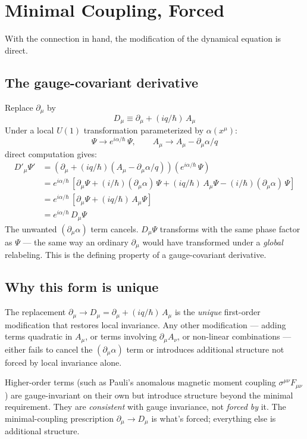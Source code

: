 \documentclass[11pt,a4paper]{article}
\begin{document}
\section{Minimal Coupling, Forced}

With the connection in hand, the modification of the dynamical equation is direct.

\subsection{The gauge-covariant derivative}

Replace $\partial_\mu$ by
\[
D_\mu \equiv \partial_\mu + (iq/\hbar)\, A_\mu
\]
Under a local $U(1)$ transformation parameterized by $\alpha(x^\mu)$:
\[
\Psi \to e^{i\alpha/\hbar}\, \Psi, \qquad A_\mu \to A_\mu - \partial_\mu \alpha/q
\]
direct computation gives:
\begin{align*}
D'_\mu \Psi' &= (\partial_\mu + (iq/\hbar)(A_\mu - \partial_\mu \alpha/q))(e^{i\alpha/\hbar}\, \Psi) \\
&= e^{i\alpha/\hbar}\, [\partial_\mu \Psi + (i/\hbar)(\partial_\mu \alpha)\, \Psi + (iq/\hbar)\, A_\mu \Psi - (i/\hbar)(\partial_\mu \alpha)\, \Psi] \\
&= e^{i\alpha/\hbar}\, [\partial_\mu \Psi + (iq/\hbar)\, A_\mu \Psi] \\
&= e^{i\alpha/\hbar}\, D_\mu \Psi
\end{align*}
The unwanted $(\partial_\mu \alpha)$ term cancels. $D_\mu \Psi$ transforms with the same phase factor as $\Psi$ --- the same way an ordinary $\partial_\mu$ would have transformed under a \emph{global} relabeling. This is the defining property of a gauge-covariant derivative.

\subsection{Why this form is unique}

The replacement $\partial_\mu \to D_\mu = \partial_\mu + (iq/\hbar)\, A_\mu$ is the \emph{unique} first-order modification that restores local invariance. Any other modification --- adding terms quadratic in $A_\mu$, or terms involving $\partial_\mu A_\nu$, or non-linear combinations --- either fails to cancel the $(\partial_\mu \alpha)$ term or introduces additional structure not forced by local invariance alone.

Higher-order terms (such as Pauli's anomalous magnetic moment coupling $\sigma^{\mu\nu} F_{\mu\nu}$) are gauge-invariant on their own but introduce structure beyond the minimal requirement. They are \emph{consistent} with gauge invariance, not \emph{forced by} it. The minimal-coupling prescription $\partial_\mu \to D_\mu$ is what's forced; everything else is additional structure.
\end{document}
